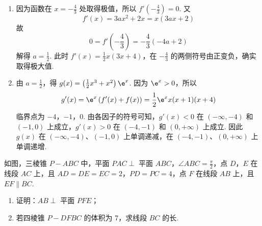 \begin{solution}
\begin{enumerate}
\item 因为函数在 \(x=-\frac{4}{3}\) 处取得极值，所以 \(f'\left(-\frac{4}{3}\right)=0\). 又
\[
f'(x)=3ax^2+2x=x(3ax+2)
\]
故
\[
0=f'\left(-\frac{4}{3}\right)=-\frac{4}{3}\left(-4a+2\right)
\]
解得 \(a=\frac{1}{2}\). 此时 \(f'(x)=\frac{1}{2}x(3x+4)\)，在 \(-\frac{4}{3}\) 的两侧符号由正变负，确实取得极大值.
\item 由 \(a=\frac{1}{2}\)，得 \(g(x)=\left(\frac{1}{2}x^3+x^2\right)\e^x\). 因为 \(\e^x>0\)，所以
\[
g'(x)=\e^x\left(f'(x)+f(x)\right)=\frac{1}{2}\e^x x(x+1)(x+4)
\]
临界点为 \(-4\)，\(-1\)，\(0\). 由各因子的符号可知，\(g'(x)<0\) 在 \((-\infty,-4)\) 和 \((-1,0)\) 上成立，\(g'(x)>0\) 在 \((-4,-1)\) 和 \((0,+\infty)\) 上成立. 因此 \(g(x)\) 在 \((-\infty,-4)\)、\((-1,0)\) 上单调递减，在 \((-4,-1)\)、\((0,+\infty)\) 上单调递增.
\end{enumerate}
\end{solution}

\begin{problem}
如图，三棱锥 \(P - ABC\) 中，平面 \(PAC \perp\) 平面 \(ABC\)，\(\angle ABC = \frac{\pi}{2}\)，点 \(D\)，\(E\) 在线段 \(AC\) 上，且 \(AD = DE = EC = 2\)，\(PD = PC = 4\)，点 \(F\) 在线段 \(AB\) 上，且 \(EF \parallel BC\).

\begin{enumerate}
\item 证明：\(AB \perp\) 平面 \(PFE\)；
\item 若四棱锥 \(P - DFBC\) 的体积为 7，求线段 \(BC\) 的长.
\end{enumerate}

\end{problem}


